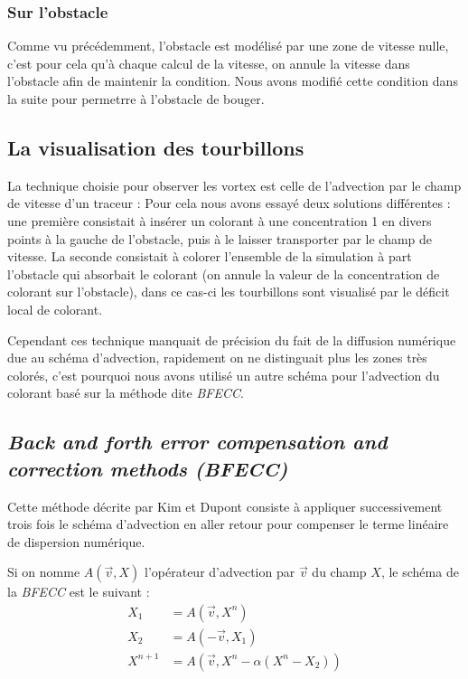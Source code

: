 		\subsubsection{Sur l'obstacle}

			Comme vu précédemment, l'obstacle est modélisé par une zone de vitesse nulle, c'est pour cela qu'à chaque calcul de la vitesse, on annule la vitesse dans l'obstacle afin de maintenir la condition. Nous avons modifié cette condition dans la suite pour permetrre à l'obstacle de bouger.

	\subsection{La visualisation des tourbillons}
	
		La technique choisie pour observer les vortex est celle de l'advection par le champ de vitesse d'un traceur : Pour cela nous avons essayé deux solutions différentes : une première consistait à insérer un colorant à une concentration 1 en divers points à la gauche de l'obstacle, puis à le laisser transporter par le champ de vitesse. La seconde consistait à colorer l'ensemble de la simulation à part l'obstacle qui absorbait le colorant (on annule la valeur de la concentration de colorant sur l'obstacle), dans ce cas-ci les tourbillons sont visualisé par le déficit local de colorant.
		
		Cependant ces technique manquait de précision du fait de la diffusion numérique due au schéma d'advection, rapidement on ne distinguait plus les zones très colorés, c'est pourquoi nous avons utilisé un autre schéma pour l'advection du colorant basé sur la méthode dite \emph{BFECC}.
		
	\subsection{\emph{Back and forth error compensation and correction methods (BFECC)}}
		Cette méthode décrite par Kim \cite{Advect} et Dupont \cite{BFECC} consiste à appliquer successivement trois fois le schéma d'advection en aller retour pour compenser le terme linéaire de dispersion numérique.
		
		Si on nomme $A(\overrightarrow{v},X)$ l'opérateur d'advection par $\overrightarrow{v}$ du champ $X$, le schéma de la \emph{BFECC} est le suivant :
		\begin{align*}
  			X_1 &	= A(\overrightarrow{v},X^n) \\
			X_2	&	= A(-\overrightarrow{v},X_1)\\
			X^{n+1}&	= A(\overrightarrow{v},X^n-\alpha(X^n-X_2))
		\end{align*}	
		
